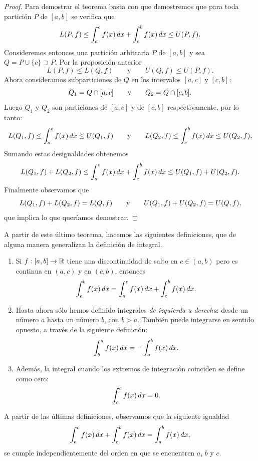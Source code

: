 \begin{proof}
  Para demostrar el teorema basta con que demostremos que para toda partición $P$ de $[a,b]$ se verifica que
  \[
  L(P,f) \le \int_a^c f(x)\,dx + \int_c^b f(x)\,dx \le U(P,f).
  \]
  Consideremos entonces una partición arbitraria $P$ de $[a,b]$ y sea $Q=P\cup\{c\}\supset P$.
  Por la proposición anterior 
  \[
  L(P,f) \le L(Q,f)
  \qquad\text{y}\qquad
  U(Q,f) \le U(P,f).
  \]
  Ahora consideramos subparticiones de $Q$ en los intervalos $[a,c]$ y $[c,b]$:
  \[
  Q_1 = Q\cap[a,c]\qquad\text y\qquad 
  Q_2 = Q\cap[c,b].
  \]
  Luego $Q_1$ y $Q_2$ son particiones de $[a,c]$ y de $[c,b]$ respectivamente, por lo tanto:
  \[
  L(Q_1,f)\le \int_a^c f(x)\,dx \le U(Q_1,f)
  \qquad\text{y}\qquad
  L(Q_2,f)\le \int_c^b f(x)\,dx \le U(Q_2,f).
  \]
  Sumando estas desigualdades obtenemos
  \[
  L(Q_1,f)+L(Q_2,f)\le \int_a^c f(x)\,dx + \int_c^b f(x)\,dx \le U(Q_1,f)+U(Q_2,f).
  \]
  Finalmente observamos que 
  \[
    L(Q_1,f)+L(Q_2,f) = L(Q,f)
    \qquad\text y\qquad
    U(Q_1,f)+U(Q_2,f) = U(Q,f),
  \]
  que implica lo que queríamos demostrar.
  \end{proof}

  \begin{definition}
    A partir de este último teorema, hacemos las siguientes definiciones, que de alguna manera generalizan la definición de integral.
    \begin{enumerate}
      \item Si $f:[a,b]\to \mathbb{R}$ tiene una discontinuidad de salto en $c\in (a,b)$ pero es continua en $(a,c)$ y en $(c,b)$, entonces
      \[
      \int_a^b f(x)\,dx = \int_a^c f(x)\,dx + \int_c^b f(x)\,dx.
      \]
      \item Hasta ahora sólo hemos definido integrales \emph{de izquierda a derecha}: desde un número $a$ hasta un número $b$, con $b>a$. También puede integrarse en sentido opuesto, a través de la siguiente definición:
      \[
      \int_b^a f(x)\,dx 
      = -\int_a^b f(x)\,dx .
      \]
      \item Además, la integral cuando los extremos de integración coinciden se define como cero:
      \[
      \int_c^c f(x)\,dx = 0.
      \]
        \end{enumerate}
  \end{definition}

  \begin{remark}
    A partir de las últimas definiciones, observamos que la siguiente igualdad
      \[
        \int_a^c f(x)\,dx + \int_c^b f(x)\,dx=\int_a^b f(x)\,dx ,
      \]
    se cumple independientemente del orden en que se encuentren $a$, $b$ y $c$.
  \end{remark}

